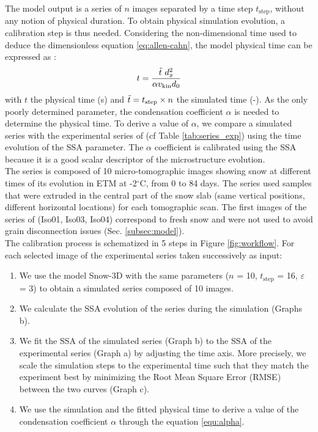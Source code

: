 \documentclass[draft,ms]{agujournal2019}
\begin{document}
 The model output is a series of $n$ images separated by a time step $t_{\mathrm{step}}$, without any notion of physical duration. To obtain physical simulation evolution, a calibration step is thus needed.
Considering the non-dimensional time used to deduce the dimensionless equation \eqref{eq:allen-cahn}, the model physical time can be expressed as \cite{bretin_and_denis_discrete-continuous_2015}: 
\begin{equation}\label{equ:alpha}
   t = \frac{\Tilde{t}\ d_x^2}{\alpha v_{\mathrm{kin}} d_0}
\end{equation}
with $t$ the physical time (s) and $\Tilde{t} = t_{\mathrm{step}} \times n$ the simulated time (-). As the only poorly determined parameter, the condensation coefficient $\alpha$ is needed to determine the physical time. To derive a value of $\alpha$, we compare a simulated series with the experimental series of  (cf Table \ref{tab:series_exp}) using the time evolution of the SSA parameter. The $\alpha$ coefficient is calibrated using the SSA because it is a good scalar descriptor of the microstructure evolution.\\
The series is composed of 10 micro-tomographic images showing snow at different times of its evolution in ETM at -2$^\circ$C, from 0 to 84 days. The series used samples that were extruded in the central part of the snow slab (same vertical positions, different horizontal locations) for each tomographic scan. The first images of the series of  (Iso01, Iso03, Iso04) correspond to fresh snow and were not used to avoid grain disconnection issues (Sec. \ref{subsec:model}).\\
The calibration process is schematized in 5 steps in Figure \ref{fig:workflow}. For each selected image of the experimental series taken successively as input: \\
\begin{enumerate}
    \item We use the model Snow-3D with the same parameters ($n$ = 10, $t_{\mathrm{step}}$ = 16, $\varepsilon$ = 3) to obtain a simulated series composed of 10 images. 
    \item We calculate the SSA evolution of the series during the simulation (Graphs b).
    \item We fit the SSA of the simulated series (Graph b) to the SSA of the experimental series (Graph a) by adjusting the time axis. More precisely, we scale the simulation steps to the experimental time such that they match the experiment best by minimizing the Root Mean Square Error (RMSE) between the two curves (Graph c).   
    \item We use the simulation and the fitted physical time to derive a value of the condensation coefficient $\alpha$ through the equation \eqref{equ:alpha}. 
\end{enumerate}
\end{document}
